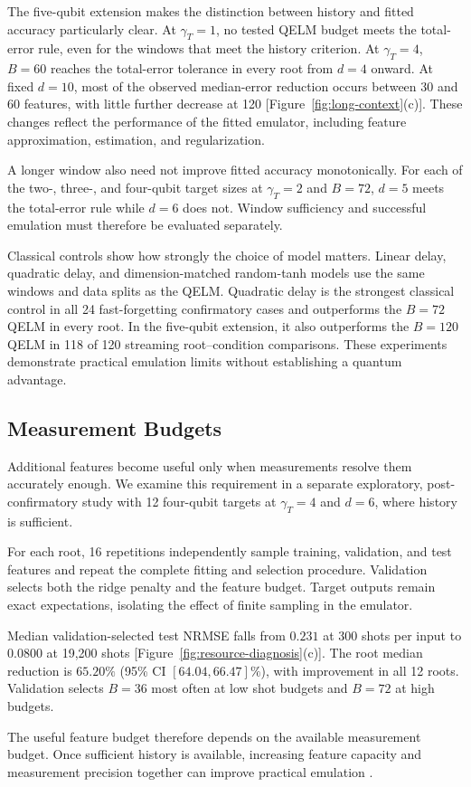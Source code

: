 The five-qubit extension makes the distinction between history and fitted
accuracy particularly clear. At $\gamma_T=1$, no tested QELM budget meets
the total-error rule, even for the windows that meet the history criterion.
At $\gamma_T=4$, $B=60$ reaches the total-error tolerance in every root from
$d=4$ onward. At fixed $d=10$, most of the observed median-error reduction
occurs between 30 and 60 features, with little further decrease at 120
[Figure~\ref{fig:long-context}(c)]. These changes reflect the performance of
the fitted emulator, including feature approximation, estimation, and
regularization.

A longer window also need not improve fitted accuracy monotonically.
For each of the two-, three-, and four-qubit target sizes at $\gamma_T=2$
and $B=72$, $d=5$ meets the total-error rule while $d=6$ does not.
Window sufficiency and successful emulation must therefore be evaluated
separately.

Classical controls show how strongly the choice of model matters.
Linear delay, quadratic delay, and dimension-matched random-tanh models
use the same windows and data splits as the QELM. Quadratic delay is the
strongest classical control in all 24 fast-forgetting confirmatory cases
and outperforms the $B=72$ QELM in every root. In the five-qubit extension,
it also outperforms the $B=120$ QELM in 118 of 120 streaming root--condition
comparisons. These experiments demonstrate practical emulation limits
without establishing a quantum advantage.

\subsection{Measurement Budgets}

Additional features become useful only when measurements resolve them
accurately enough. We examine this requirement in a separate exploratory,
post-confirmatory study with 12 four-qubit targets at $\gamma_T=4$ and $d=6$,
where history is sufficient.

For each root, 16 repetitions independently sample training, validation,
and test features and repeat the complete fitting and selection procedure.
Validation selects both the ridge penalty and the feature budget.
Target outputs remain exact expectations, isolating the effect of finite
sampling in the emulator.

Median validation-selected test NRMSE falls from $0.231$ at 300 shots per
input to $0.0800$ at 19,200 shots [Figure~\ref{fig:resource-diagnosis}(c)].
The root median reduction is $65.20\%$ (95\% CI $[64.04,66.47]\%$),
with improvement in all 12 roots. Validation selects $B=36$ most often at
low shot budgets and $B=72$ at high budgets.

The useful feature budget therefore depends on the available measurement
budget. Once sufficient history is available, increasing feature capacity
and measurement precision together can improve practical emulation
\cite{hu2023sampling,ahmed2025finite}.
